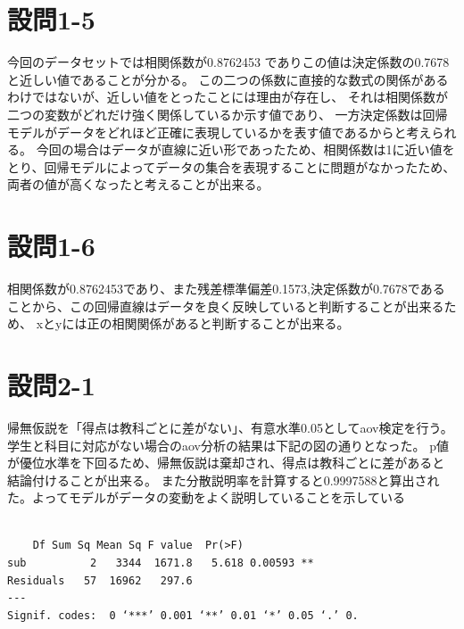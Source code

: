 \documentclass[fontsize = 10pt, paper= a4]{jlreq}
\begin{document}
\section{設問1-5}
    今回のデータセットでは相関係数が0.8762453 でありこの値は決定係数の0.7678と近しい値であることが分かる。
    この二つの係数に直接的な数式の関係があるわけではないが、近しい値をとったことには理由が存在し、
    それは相関係数が二つの変数がどれだけ強く関係しているか示す値であり、
    一方決定係数は回帰モデルがデータをどれほど正確に表現しているかを表す値であるからと考えられる。
    今回の場合はデータが直線に近い形であったため、相関係数は1に近い値をとり、回帰モデルによってデータの集合を表現することに問題がなかったため、
    両者の値が高くなったと考えることが出来る。
   
\section{設問1-6}
    相関係数が0.8762453であり、また残差標準偏差0.1573,決定係数が0.7678であることから、この回帰直線はデータを良く反映していると判断することが出来るため、
    xとyには正の相関関係があると判断することが出来る。

\section{設問2-1}
帰無仮説を「得点は教科ごとに差がない」、有意水準0.05としてaov検定を行う。
学生と科目に対応がない場合のaov分析の結果は下記の図の通りとなった。
p値が優位水準を下回るため、帰無仮説は棄却され、得点は教科ごとに差があると結論付けることが出来る。
また分散説明率を計算すると0.9997588と算出された。よってモデルがデータの変動をよく説明していることを示している


\begin{lstlisting}[basicstyle=\ttfamily\footnotesize, frame=single]

    Df Sum Sq Mean Sq F value  Pr(>F)   
sub          2   3344  1671.8   5.618 0.00593 **
Residuals   57  16962   297.6                   
---
Signif. codes:  0 ‘***’ 0.001 ‘**’ 0.01 ‘*’ 0.05 ‘.’ 0.

    \end{lstlisting}
\end{document}
